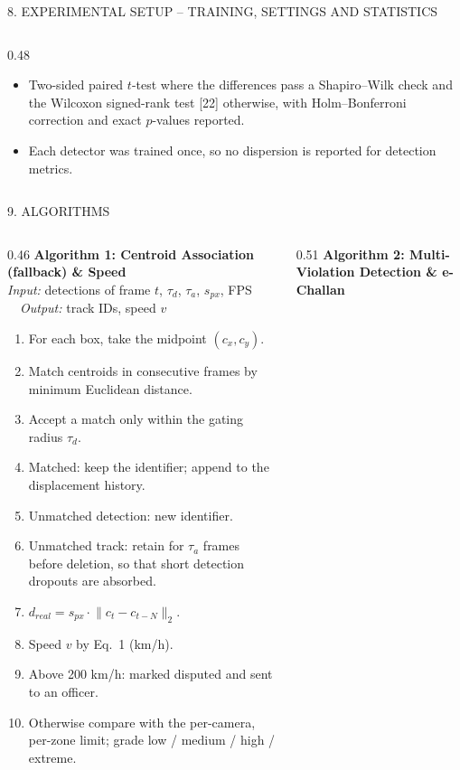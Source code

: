 \documentclass[aspectratio=169,10pt,t]{beamer}
\newcommand{\hd}[1]{{\color{dsblue}\textbf{#1}}}          %
\begin{document}
\begin{frame}{8. EXPERIMENTAL SETUP -- TRAINING, SETTINGS AND STATISTICS}
\begin{columns}[T,onlytextwidth]
\begin{column}{0.48\textwidth}
\begin{itemize}
        any difference is attributable to association alone.
  \item Two-sided paired $t$-test where the differences pass a Shapiro--Wilk check and the Wilcoxon signed-rank test
        [22] otherwise, with Holm--Bonferroni correction and exact $p$-values reported.
  \item Each detector was trained once, so no dispersion is reported for detection metrics.
\end{itemize}
\end{column}
\end{columns}
\end{frame}

\begin{frame}{9. ALGORITHMS}
\begin{columns}[T,onlytextwidth]
\begin{column}{0.46\textwidth}
\hd{\small Algorithm 1: Centroid Association (fallback) \& Speed}\\
{\tiny\textit{Input:} detections of frame $t$, $\tau_d$, $\tau_a$, $s_{px}$, FPS \ \ \textit{Output:} track IDs, speed $v$}
\scriptsize
\begin{enumerate}\setlength{\itemsep}{0em}
  \item For each box, take the midpoint $(c_x, c_y)$.
  \item Match centroids in consecutive frames by minimum Euclidean distance.
  \item Accept a match only within the gating radius $\tau_d$.
  \item Matched: keep the identifier; append to the displacement history.
  \item Unmatched detection: new identifier.
  \item Unmatched track: retain for $\tau_a$ frames before deletion, so that short detection dropouts are absorbed.
  \item $d_{real} = s_{px}\cdot\lVert c_t - c_{t-N}\rVert_2$.
  \item Speed $v$ by Eq.~1 (km/h).
  \item Above 200 km/h: marked disputed and sent to an officer.
  \item Otherwise compare with the per-camera, per-zone limit; grade low / medium / high / extreme.
\end{enumerate}
\end{column}
\begin{column}{0.51\textwidth}
\hd{\small Algorithm 2: Multi-Violation Detection \& e-Challan}\\

\end{column}
\end{columns}
\end{frame}
\end{document}
